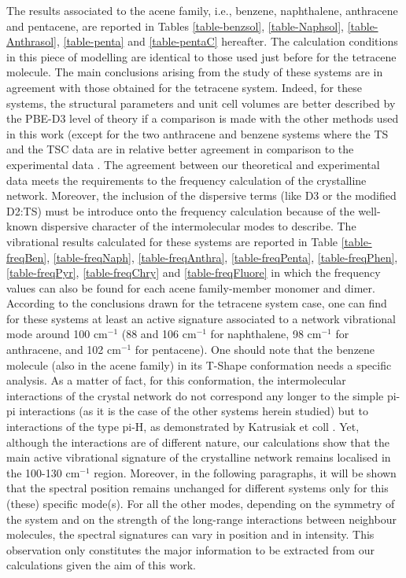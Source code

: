  	The results associated to the acene family, i.e., benzene, naphthalene, anthracene and pentacene, are reported in Tables \ref{table-benzsol}, \ref{table-Naphsol}, \ref{table-Anthrasol}, \ref{table-penta} and \ref{table-pentaC} hereafter. The calculation conditions in this piece of modelling are identical to those used just before for the tetracene molecule. The main conclusions arising from the study of these systems are in agreement with those obtained for the tetracene system. Indeed, for these systems, the structural parameters and unit cell volumes are better described by the PBE-D3 level of theory if a comparison is made with the other methods used in this work (except for the two anthracene and benzene systems where the TS and the TSC data are in relative better agreement in comparison to the experimental data \cite{buvcko2013tkatchenko}. The agreement between our theoretical and experimental data meets the requirements to the frequency calculation of the crystalline network. Moreover, the inclusion of the dispersive terms (like D3 or the modified D2:TS) must be introduce onto the frequency calculation because of the well-known dispersive character of the intermolecular modes to describe. The vibrational results calculated for these systems are reported in Table \ref{table-freqBen}, \ref{table-freqNaph}, \ref{table-freqAnthra}, \ref{table-freqPenta}, \ref{table-freqPhen}, \ref{table-freqPyr}, \ref{table-freqChry} and \ref{table-freqFluore} in which the frequency values can also be found for each acene family-member monomer and dimer. According to the conclusions drawn for the tetracene system case, one can find for these systems at least an active signature associated to a network vibrational mode around 100 cm$^{-1}$ (88 and 106 cm$^{-1}$ for naphthalene, 98 cm$^{-1}$ for anthracene, and 102 cm$^{-1}$ for pentacene). One should note that the benzene molecule (also in the acene family) in its T-Shape conformation needs a specific analysis. As a matter of fact, for this conformation, the intermolecular interactions of the crystal network do not correspond any longer to the simple pi-pi interactions (as it is the case of the other systems herein studied) but to interactions of the type pi-H, as demonstrated by Katrusiak et coll \cite{katrusiak2010association}. Yet, although the interactions are of different nature, our calculations show that the main active vibrational signature of the crystalline network remains localised in the 100-130 cm$^{-1}$ region. Moreover, in the following paragraphs, it will be shown that the spectral position remains unchanged for different systems only for this (these) specific mode(s). For all the other modes, depending on the symmetry of the system and on the strength of the long-range interactions between neighbour molecules, the spectral signatures can vary in position and in intensity. This observation only constitutes the major information to be extracted from our calculations given the aim of this work.	
 	
